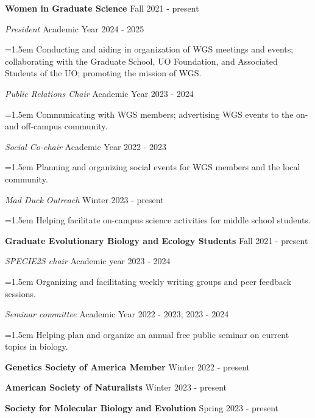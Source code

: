 \documentclass[11pt]{extarticle}
\begin{document}
\noindent \textbf{Women in Graduate Science}  \hfill Fall 2021 - present \par
\vspace{1mm}
\textit{President} \hfill Academic Year 2024 - 2025 \par
{\narrower \hangindent=1.5em {Conducting and aiding in organization of WGS meetings and events;
                                          collaborating with the Graduate School, UO Foundation, and Associated Students of the UO;
                                          promoting the mission of WGS.} \normalsize \par }
\vspace{1mm}
\textit{Public Relations Chair} \hfill Academic Year 2023 - 2024 \par
{\narrower \hangindent=1.5em {Communicating with WGS members; 
                                        advertising WGS events to the on- and off-campus community.} \normalsize \par }
\vspace{1mm}
\textit{Social Co-chair} \hfill Academic Year 2022 - 2023 \par
{\narrower \hangindent=1.5em {Planning and organizing social events for WGS members and the local community.} \normalsize \par }
\vspace{1mm}
\textit{Mad Duck Outreach} \hfill Winter 2023 - present \par
{\narrower \hangindent=1.5em {Helping facilitate on-campus science activities for middle school students.} \normalsize \par }
\vspace{2.5mm}
\noindent \textbf{Graduate Evolutionary Biology and Ecology Students} \hfill Fall 2021 - present \par
\vspace{1mm}
\textit{SPECIE2S chair} \hfill Academic year 2023 - 2024 \par
{\narrower \hangindent=1.5em {Organizing and facilitating weekly writing groups and peer feedback sessions.} \normalsize \par }
\vspace{2.5mm}
\vspace{1mm}
\textit{Seminar committee} \hfill Academic Year 2022 - 2023; 2023 - 2024 \par
{\narrower \hangindent=1.5em {Helping plan and organize an annual free public seminar on current topics in biology.} \normalsize \par }
\vspace{2.5mm}
\noindent \textbf{Genetics Society of America Member} \hfill Winter 2022 - present \par
\vspace{2.5mm}
\noindent \textbf{American Society of Naturalists} \hfill Winter 2023 - present \par
\vspace{2.5mm}
\noindent \textbf{Society for Molecular Biology and Evolution} \hfill Spring 2023 - present \par
\end{document}
